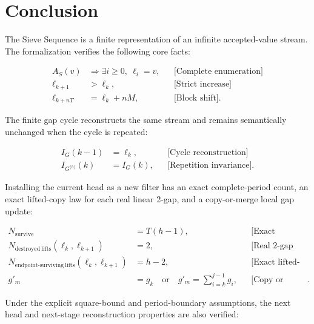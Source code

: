 \section{Conclusion}
\label{sec:conclusion}

The Sieve Sequence is a finite representation of an infinite
accepted-value stream. The formalization verifies the following core
facts:

\begin{equation*}
\begin{aligned}
A_S(v)
&\Longrightarrow \exists i\ge0,\ \ell_i=v,
  &&\text{[Complete enumeration]} \\
\ell_{k+1}&\gt\ell_k,
  &&\text{[Strict increase]} \\
\ell_{k+nT}&=\ell_k+nM,
  &&\text{[Block shift]}.
\end{aligned}
\end{equation*}

The finite gap cycle reconstructs the same stream and remains
semantically unchanged when the cycle is repeated:

\begin{equation*}
\begin{aligned}
I_G(k-1)&=\ell_k,
  &&\text{[Cycle reconstruction]} \\
I_{G^{\langle h\rangle}}(k)&=I_G(k),
  &&\text{[Repetition invariance]}.
\end{aligned}
\end{equation*}

Installing the current head as a new filter has an exact
complete-period count, an exact lifted-copy law for each real linear
2-gap, and a copy-or-merge local gap update:

\begin{equation*}
\begin{aligned}
N_{\mathrm{survive}}&=T(h-1),
  &&\text{[Exact expanded filtering]} \\
N_{\mathrm{destroyed\ lifts}}(\ell_k,\ell_{k+1})&=2,
  &&\text{[Real 2-gap endpoint strikes]} \\
N_{\mathrm{endpoint\text{-}surviving\ lifts}}(\ell_k,\ell_{k+1})&=h-2,
  &&\text{[Exact lifted-copy survival]} \\
g'_m&=g_k
  \quad\text{or}\quad
  g'_m=\sum_{i=k}^{j-1}g_i,
  &&\text{[Copy or merge]}.
\end{aligned}
\end{equation*}

Under the explicit square-bound and period-boundary assumptions, the
next head and next-stage reconstruction properties are also verified:

